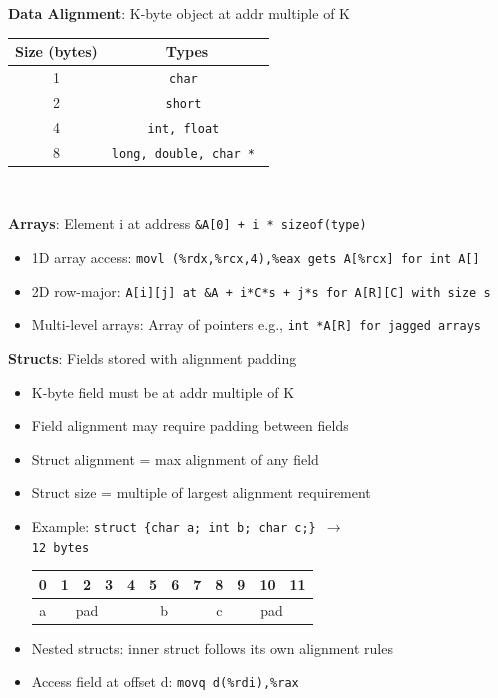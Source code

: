\textbf{Data Alignment}: K-byte object at addr multiple of K
\begin{center}
    \begin{tabular}{| c || c |}
    \hline
    \textbf{Size (bytes)} & \textbf{Types}\\ \hline
    1 & \tt{char}  \\ \hline
    2 & \tt{short} \\ \hline
    4 & \tt{int, float}  \\ \hline
    8 & \tt{long, double, char *} \\ \hline
    \end{tabular} \\
\end{center}
\vspace{7pt}
\textbf{Arrays}: Element i at address \tt{\&A[0] + i * sizeof(type)}
\begin{itemize}[noitemsep, topsep=1pt]
    \item 1D array access: \tt{movl (\%rdx,\%rcx,4),\%eax} gets \tt{A[\%rcx]} for \tt{int A[]}
    \item 2D row-major: \tt{A[i][j]} at \tt{\&A + i*C*s + j*s} for \tt{A[R][C]} with size s
    \item Multi-level arrays: Array of pointers e.g., \tt{int *A[R]} for jagged arrays
\end{itemize}
\vspace{10pt}
\textbf{Structs}: Fields stored with alignment padding
\begin{itemize}[noitemsep, topsep=1pt]
    \item K-byte field must be at addr multiple of K
    \item Field alignment may require padding between fields
    \item Struct alignment = max alignment of any field
    \item Struct size = multiple of largest alignment requirement
    \item Example: \tt{struct \{char a; int b; char c;\}} $\rightarrow$ \\12 bytes
      \begin{tabular}{|c|c|c|c|c|c|c|c|c|c|c|c|} \hline
        0 & 1 & 2 & 3 & 4 & 5 & 6 & 7 & 8 & 9 & 10 & 11 \\ \hline
        a & \multicolumn{3}{c|}{pad} & \multicolumn{4}{c|}{b} & c & \multicolumn{3}{c|}{pad} \\ \hline
      \end{tabular}
    \item Nested structs: inner struct follows its own alignment rules
    \item Access field at offset d: \tt{movq d(\%rdi),\%rax}
\end{itemize}

